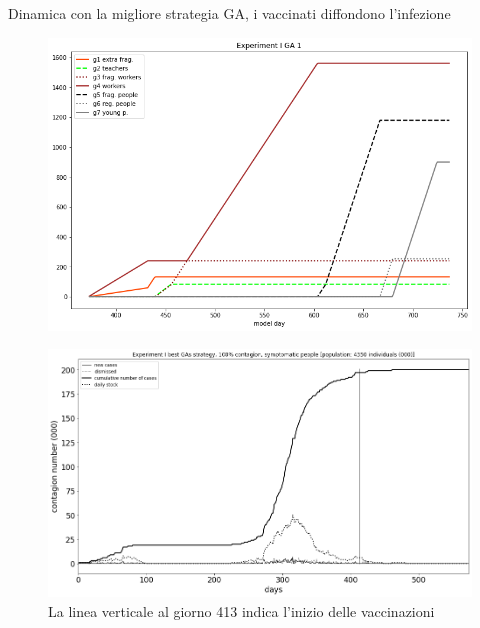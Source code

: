 \documentclass[]{beamer}
\begin{document}
\begin{frame}{Dinamica con la migliore strategia GA, i vaccinati diffondono l'infezione}

\begin{figure}[H]
\center
\includegraphics[scale=0.16]{Experiment_I_GA_1_VaccinationSequence.png} %

\label{Experiment_I_GA1VaccinationSequence}
\end{figure}

\begin{figure}[H]
\center
\includegraphics[scale=0.16]{Experiment_I_1_GAs_symptomatic_series.png}

\caption{La linea verticale al giorno 413 indica l'inizio delle vaccinazioni}
\label{Experiment_I_GAs1SymptomaticSeries}
\end{figure}


\end{frame}
\end{document}
